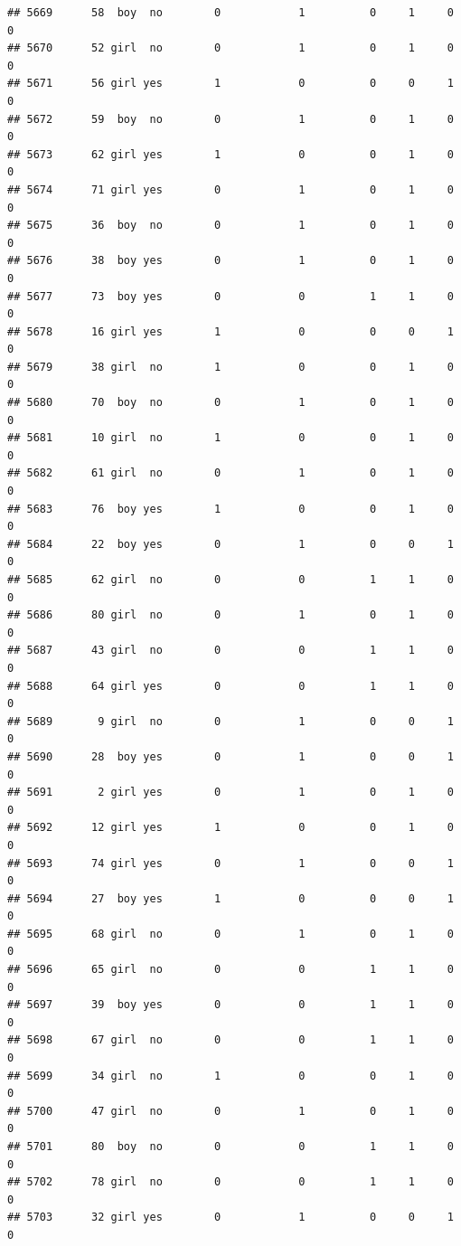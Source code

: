 \documentclass[man]{apa6}
\begin{document}
\begin{verbatim}
## 5669      58  boy  no        0            1          0     1     0     0
## 5670      52 girl  no        0            1          0     1     0     0
## 5671      56 girl yes        1            0          0     0     1     0
## 5672      59  boy  no        0            1          0     1     0     0
## 5673      62 girl yes        1            0          0     1     0     0
## 5674      71 girl yes        0            1          0     1     0     0
## 5675      36  boy  no        0            1          0     1     0     0
## 5676      38  boy yes        0            1          0     1     0     0
## 5677      73  boy yes        0            0          1     1     0     0
## 5678      16 girl yes        1            0          0     0     1     0
## 5679      38 girl  no        1            0          0     1     0     0
## 5680      70  boy  no        0            1          0     1     0     0
## 5681      10 girl  no        1            0          0     1     0     0
## 5682      61 girl  no        0            1          0     1     0     0
## 5683      76  boy yes        1            0          0     1     0     0
## 5684      22  boy yes        0            1          0     0     1     0
## 5685      62 girl  no        0            0          1     1     0     0
## 5686      80 girl  no        0            1          0     1     0     0
## 5687      43 girl  no        0            0          1     1     0     0
## 5688      64 girl yes        0            0          1     1     0     0
## 5689       9 girl  no        0            1          0     0     1     0
## 5690      28  boy yes        0            1          0     0     1     0
## 5691       2 girl yes        0            1          0     1     0     0
## 5692      12 girl yes        1            0          0     1     0     0
## 5693      74 girl yes        0            1          0     0     1     0
## 5694      27  boy yes        1            0          0     0     1     0
## 5695      68 girl  no        0            1          0     1     0     0
## 5696      65 girl  no        0            0          1     1     0     0
## 5697      39  boy yes        0            0          1     1     0     0
## 5698      67 girl  no        0            0          1     1     0     0
## 5699      34 girl  no        1            0          0     1     0     0
## 5700      47 girl  no        0            1          0     1     0     0
## 5701      80  boy  no        0            0          1     1     0     0
## 5702      78 girl  no        0            0          1     1     0     0
## 5703      32 girl yes        0            1          0     0     1     0

\end{verbatim}
\end{document}
